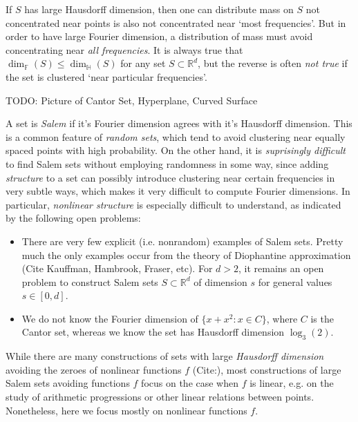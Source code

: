\documentclass[12pt]{article}
\numberwithin{equation}{section}
\theoremstyle{plain}
\theoremstyle{remark}
\newcommand{\newpart}[1]
{\colorbox[rgb]{0.97,0.92,0.7}{\makebox[0.97\columnwidth]
{\rule[-1.2ex]{0pt}{3.7ex}\partfont{#1}}}\bigskip}
\newcommand{\partfont}[1]{{\Large \textsf{\textbf{#1}}}}
\begin{document}
{{\begin{multicols}{2}
{If $S$ has large Hausdorff dimension, then one can distribute mass on $S$ not concentrated near points is also not concentrated near `most frequencies'. But in order to have large Fourier dimension, a distribution of mass must avoid concentrating near \emph{all frequencies}. It is always true that $\dim_{\mathbb{F}}(S) \leq \dim_{\mathbb{H}}(S)$ for any set $S \subset \mathbb{R}^d$, but the reverse is often \emph{not true} if the set is clustered `near particular frequencies'.
}

TODO: Picture of Cantor Set, Hyperplane, Curved Surface

\columnbreak

\newpart{Salem Sets: Structure vs. Randomness}

\large{
A set is \emph{Salem} if it's Fourier dimension agrees with it's Hausdorff dimension. This is a common feature of \emph{random sets}, which tend to avoid clustering near equally spaced points with high probability. On the other hand, it is \emph{suprisingly difficult} to find Salem sets without employing randomness in some way, since adding \emph{structure} to a set can possibly introduce clustering near certain frequencies in very subtle ways, which makes it very difficult to compute Fourier dimensions. In particular, \emph{nonlinear structure} is especially difficult to understand, as indicated by the following open problems:
%
\begin{itemize}
    \item There are very few explicit (i.e. nonrandom) examples of Salem sets. Pretty much the only examples occur from the theory of Diophantine approximation (Cite Kauffman, Hambrook, Fraser, etc). For $d > 2$, it remains an open problem to construct Salem sets $S \subset \mathbb{R}^d$ of dimension $s$ for general values $s \in [0,d]$.

    \item We do not know the Fourier dimension of $\{ x + x^2 : x \in C \}$, where $C$ is the Cantor set, whereas we know the set has Hausdorff dimension $\log_3(2)$.
\end{itemize}
%
While there are many constructions of sets with large \emph{Hausdorff dimension} avoiding the zeroes of nonlinear functions $f$ (Cite:), most constructions of large Salem sets avoiding functions $f$ focus on the case when $f$ is linear, e.g. on the study of arithmetic progressions or other linear relations between points. Nonetheless, here we focus mostly on nonlinear functions $f$.\\

}
\end{multicols}}}
\end{document}
